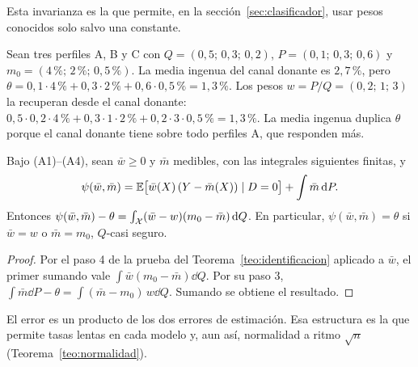 Esta invarianza es la que permite, en la sección~\ref{sec:clasificador}, usar pesos conocidos solo salvo una constante.

\begin{ejemplo}\label{ej:juguete}
Sean tres perfiles A, B y C con $Q=(0,5;\,0,3;\,0,2)$, $P=(0,1;\,0,3;\,0,6)$ y $m_0=(4\,\%;\,2\,\%;\,0,5\,\%)$. La media ingenua del canal donante es $2,7\,\%$, pero $\theta=0,1\cdot4\,\%+0,3\cdot2\,\%+0,6\cdot0,5\,\%=1,3\,\%$. Los pesos $w=P/Q=(0,2;\,1;\,3)$ la recuperan desde el canal donante: $0,5\cdot0,2\cdot4\,\%+0,3\cdot1\cdot2\,\%+0,2\cdot3\cdot0,5\,\%=1,3\,\%$. La media ingenua duplica $\theta$ porque el canal donante tiene sobre todo perfiles A, que responden más.
\end{ejemplo}

\begin{proposicion}\label{prop:dr}
Bajo (A1)--(A4), sean $\bar w\ge0$ y $\bar m$ medibles, con las integrales siguientes finitas, y
\[
\psi(\bar w,\bar m)=\mathbb{E}\bigl[\bar w(X)\,(Y-\bar m(X))\mid D=0\bigr]+\int\bar m\,\mathrm{d} P .
\]
Entonces $\psi(\bar w,\bar m)-\theta=\int_{\mathcal{X}}(\bar w-w)(m_0-\bar m)\,\mathrm{d} Q$. En particular, $\psi(\bar w,\bar m)=\theta$ si $\bar w=w$ o $\bar m=m_0$, $Q$-casi seguro.
\end{proposicion}
\begin{proof}
Por el paso 4 de la prueba del Teorema~\ref{teo:identificacion} aplicado a $\bar w$, el primer sumando vale $\int\bar w(m_0-\bar m)\dd Q$. Por su paso 3, $\int\bar m\dd P-\theta=\int(\bar m-m_0)\,w\dd Q$. Sumando se obtiene el resultado.
\end{proof}

El error es un producto de los dos errores de estimación. Esa estructura es la que permite tasas lentas en cada modelo y, aun así, normalidad a ritmo $\sqrt n$ (Teorema~\ref{teo:normalidad}).
